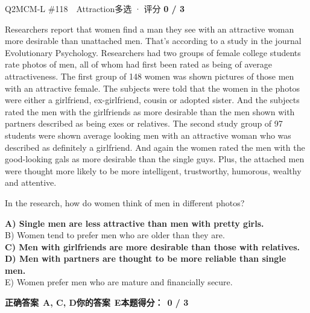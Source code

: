 \begin{qblock}{Q2\quad MCM-L \#118\ \ Attraction}{多选 · 评分 \textcolor{cAccent}{\bfseries 0 / 3}}
\begin{promptbox}
Researchers report that women find a man they see with an attractive woman more desirable than unattached men. That's according to a study in the journal Evolutionary Psychology. Researchers had two groups of female college students rate photos of men, all of whom had first been rated as being of average attractiveness. The first group of 148 women was shown pictures of those men with an attractive female. The subjects were told that the women in the photos were either a girlfriend, ex-girlfriend, cousin or adopted sister. And the subjects rated the men with the girlfriends as more desirable than the men shown with partners described as being exes or relatives. The second study group of 97 students were shown average looking men with an attractive woman who was described as definitely a girlfriend. And again the women rated the men with the good-looking gals as more desirable than the single guys. Plus, the attached men were thought more likely to be more intelligent, trustworthy, humorous, wealthy and attentive.
\end{promptbox}
\begin{notebox}In the research, how do women think of men in different photos?\end{notebox}
{\small
{\color{cFix}\textbf{A) Single men are less attractive than men with pretty girls.}}\\
B) Women tend to prefer men who are older than they are.\\
{\color{cFix}\textbf{C) Men with girlfriends are more desirable than those with relatives.}}\\
{\color{cFix}\textbf{D) Men with partners are thought to be more reliable than single men.}}\\
E) Women prefer men who are mature and financially secure.}
\par\smallskip
\textbf{正确答案}\ \textcolor{cFix}{\bfseries A, C, D}\qquad\textbf{你的答案}\ {\color{cWrong}\bfseries E}\qquad\textbf{本题得分：}\ {\color{cAccent}\bfseries 0 / 3}
\end{qblock}

